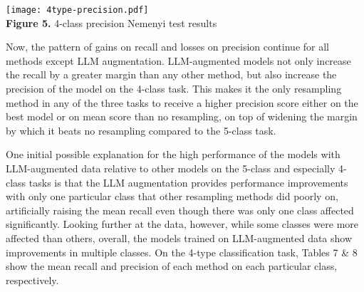 \documentclass[runningheads]{llncs}
\newenvironment{nscenter}
 {\parskip=0pt\par\nopagebreak\centering}
 {\par\noindent\ignorespacesafterend}
\begin{document}
\begin{nscenter}
\texttt{[image: 4type-precision.pdf]}\\
{\bf Figure 5.} 4-class precision Nemenyi test results
\end{nscenter}
Now, the pattern of gains on recall and losses on precision continue for all methods except LLM augmentation. LLM-augmented models not only increase the recall by a greater margin than any other method, but also increase the precision of the model on the 4-class task. This makes it the only resampling method in any of the three tasks to receive a higher precision score either on the best model or on mean score than no resampling, on top of widening the margin by which it beats no resampling compared to the 5-class task.

One initial possible explanation for the high performance of the models with LLM-augmented data relative to other models on the 5-class and especially 4-class tasks is that the LLM augmentation provides performance improvements with only one particular class that other resampling methods did poorly on, artificially raising the mean recall even though there was only one class affected significantly. Looking further at the data, however, while some classes were more affected than others, overall, the models trained on LLM-augmented data show improvements in multiple classes. On the 4-type classification task, Tables 7 \& 8 show the mean recall and precision of each method on each particular class, respectively.
\end{document}

